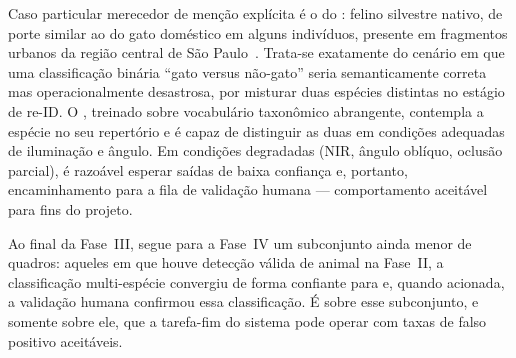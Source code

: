 Caso particular merecedor de menção explícita é o do : felino silvestre nativo, de porte similar ao do gato doméstico em alguns indivíduos, presente em fragmentos urbanos da região central de São Paulo~\cite{goncalves2025wildcat}. Trata-se exatamente do cenário em que uma classificação binária ``gato versus não-gato'' seria semanticamente correta mas operacionalmente desastrosa, por misturar duas espécies distintas no estágio de re-ID. O \modeloSN, treinado sobre vocabulário taxonômico abrangente, contempla a espécie no seu repertório e é capaz de distinguir as duas em condições adequadas de iluminação e ângulo. Em condições degradadas (NIR, ângulo oblíquo, oclusão parcial), é razoável esperar saídas de baixa confiança e, portanto, encaminhamento para a fila de validação humana --- comportamento aceitável para fins do projeto.

Ao final da Fase~III, segue para a Fase~IV um subconjunto ainda menor de quadros: aqueles em que houve detecção válida de animal na Fase~II, a classificação multi-espécie convergiu de forma confiante para  e, quando acionada, a validação humana confirmou essa classificação. É sobre esse subconjunto, e somente sobre ele, que a tarefa-fim do sistema pode operar com taxas de falso positivo aceitáveis.
